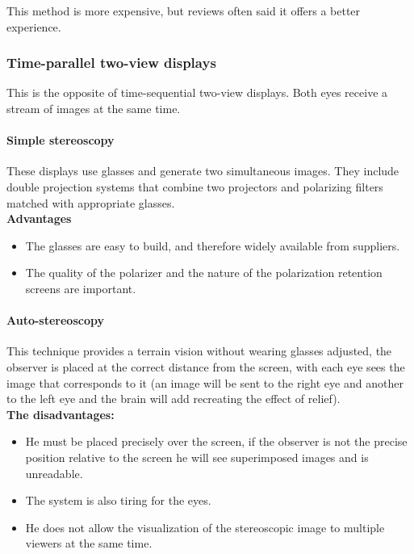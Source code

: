 This method is more expensive, but reviews often said it offers a better experience.

\subsubsection{Time-parallel two-view displays}
This is the opposite of time-sequential two-view displays. Both eyes receive a stream of images at the same time.

\paragraph{Simple stereoscopy}
These displays use glasses and generate two simultaneous images. They include double projection systems that combine two projectors and polarizing filters matched with appropriate glasses.\\

\textbf{Advantages}
\begin{itemize}
\item The glasses are easy to build, and therefore widely available from suppliers.
\item The quality of the polarizer and the nature of the polarization retention screens are important.
\end{itemize}

\paragraph{Auto-stereoscopy}
This technique provides a terrain vision without wearing glasses adjusted, the observer is placed at the correct distance from the screen, with each eye sees the image that corresponds to it (an image will be sent to the right eye and another to the left eye and the brain will add recreating the effect of relief).\\
\textbf{The disadvantages:}
\begin{itemize}
\item He must be placed precisely over the screen, if the observer is not the precise position relative to the screen he will see superimposed images and is unreadable.
\item The system is also tiring for the eyes.
\item He does not allow the visualization of the stereoscopic image to multiple viewers at the same time.
\end{itemize}

